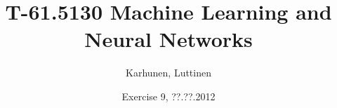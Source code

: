 
\title{T-61.5130 Machine Learning and Neural Networks}
\author{Karhunen, Luttinen}
\date{Exercise 9, ??.??.2012}

\usepackage{pdfpages}


\newcommand{\vect}[1]{{\bf{#1}}}
\newcommand{\svect}[1]{\boldsymbol{#1}}
\newcommand{\matr}[1]{\boldsymbol{#1}}

\renewcommand{\vec}[1]{\mathbf{#1}}
\newcommand{\set}[1]{\mathcal{#1}}
\newcommand{\C}{\set{C}}
\newcommand{\E}{\mathcal{E}}
\newcommand{\I}{\vec{I}}
\renewcommand{\L}{\mathcal{L}}
\newcommand{\N}{\mathrm{I \negmedspace N}}
\newcommand{\R}{\mathrm{I \negmedspace R}}
\newcommand{\V}{\set{V}}
\newcommand{\W}{\vec{W}}
\newcommand{\X}{\set{X}}
\newcommand{\e}{\vec{e}}
\newcommand{\h}{\vec{h}}
\newcommand{\m}{\vec{m}}
\newcommand{\mub}{\boldsymbol{\mu}}
\newcommand{\n}{\vec{n}}
\renewcommand{\t}{\vec{t}}
\renewcommand{\u}{\vec{u}}
\renewcommand{\v}{\vec{v}}
\newcommand{\w}{\vec{w}}
\newcommand{\x}{\vec{x}}
\newcommand{\y}{\vec{y}}
\newcommand{\Y}{\vec{Y}}
\newcommand{\z}{\vec{z}}
\newcommand{\argmin}{\operatornamewithlimits{argmin}}
\newcommand{\argmax}{\operatornamewithlimits{argmax}}
\newcommand{\bSigma}{\boldsymbol{\Sigma}}





\maketitle


